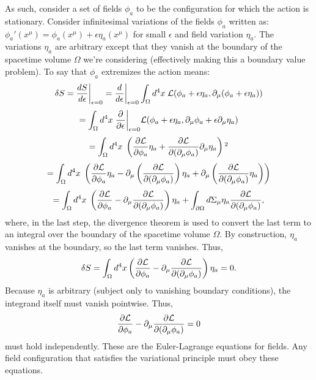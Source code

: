\noindent As such, consider a set of fields $\phi_a$ to be the configuration for which the action is stationary. Consider infinitesimal variations of the fields $\phi_a$ written as: $\phi_a'(x^\mu) = \phi_a(x^\mu) + \epsilon \eta_a(x^\mu)$ for small $\epsilon$ and field variation $\eta_a$. The variations $\eta_a$ are arbitrary except that they vanish at the boundary of the spacetime volume $\Omega$ we're considering (effectively making this a boundary value problem). To say that $\phi_a$ extremizes the action means:
\[
    \delta S = \frac{dS}{d\epsilon}\bigg|_{\epsilon=0} = \frac{d}{d\epsilon}\bigg|_{\epsilon=0}\int_\Omega d^4x \;\mathcal{L}(\phi_a+\epsilon\eta_a, \partial_\mu(\phi_a + \epsilon\eta_a))
\]
\[
    = \int_\Omega d^4 x\;\frac{\partial}{\partial \epsilon}\bigg|_{\epsilon=0}\mathcal{L}(\phi_a+\epsilon\eta_a,\partial_\mu\phi_a + \epsilon\partial_\mu\eta_a)
\]
\[
    =\int_\Omega d^4x\; \left(\frac{\partial\Lag}{\partial\phi_a}\eta_a + \frac{\partial\Lag}{\partial(\partial_\mu\phi_a)}\partial_\mu\eta_a\right)\footnotemark[2]
\]
\[
    =\int_\Omega d^4x\; \left(\frac{\partial\mathcal{L}}{\partial\phi_a}\eta_a -\partial_\mu\left(\frac{\partial\mathcal{L}}{\partial(\partial_\mu\phi_a)}\right)\eta_a+\partial_\mu\left(\frac{\partial\mathcal{L}}{\partial(\partial_\mu\phi_a)}\eta_a\right)\right)
\]
\[
    =\int_\Omega d^4x\; \left(\frac{\partial\mathcal{L}}{\partial\phi_a}-\partial_\mu\frac{\partial\mathcal{L}}{\partial(\partial_\mu\phi_a)}\right)\eta_a + \int_{\partial\Omega}d\Sigma_\mu\eta_a\frac{\partial\mathcal{L}}{\partial(\partial_\mu\phi_a)},
\]
where, in the last step, the divergence theorem is used to convert the last term to an integral over the boundary of the spacetime volume $\Omega$. By construction, $\eta_a$ vanishes at the boundary, so the last term vanishes. Thus,
\[
    \delta S = \int_\Omega d^4x \left(\frac{\partial\mathcal{L}}{\partial\phi_a} - \partial_\mu\frac{\partial\mathcal{L}}{\partial(\partial_\mu\phi_a)}\right)\eta_a = 0.
\]
Because $\eta_a$ is arbitrary (subject only to vanishing boundary conditions), the integrand itself must vanish pointwise. Thus, 
\[
    \frac{\partial\mathcal{L}}{\partial\phi_a} - \partial_\mu\frac{\partial\mathcal{L}}{\partial(\partial_\mu\phi_a)}=0
\]
must hold independently. These are the Euler-Lagrange equations for fields. Any field configuration that satisfies the variational principle must obey these equations. \\

